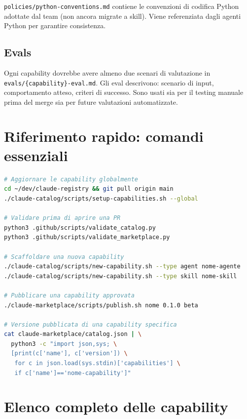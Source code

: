\documentclass[12pt,a4paper,twoside]{book}
\begin{document}
\texttt{policies/python-conventions.md} contiene le convenzioni di codifica Python adottate dal team (non ancora migrate a skill). Viene referenziata dagli agenti Python per garantire consistenza.

\section{Evals}

Ogni capability dovrebbe avere almeno due scenari di valutazione in \texttt{evals/\{capability\}-eval.md}. Gli eval descrivono: scenario di input, comportamento atteso, criteri di successo. Sono usati sia per il testing manuale prima del merge sia per future valutazioni automatizzate.

\appendix

\chapter{Riferimento rapido: comandi essenziali}

\begin{lstlisting}[language=bash]
# Aggiornare le capability globalmente
cd ~/dev/claude-registry && git pull origin main
./claude-catalog/scripts/setup-capabilities.sh --global

# Validare prima di aprire una PR
python3 .github/scripts/validate_catalog.py
python3 .github/scripts/validate_marketplace.py

# Scaffoldare una nuova capability
./claude-catalog/scripts/new-capability.sh --type agent nome-agente
./claude-catalog/scripts/new-capability.sh --type skill nome-skill

# Pubblicare una capability approvata
./claude-marketplace/scripts/publish.sh nome 0.1.0 beta

# Versione pubblicata di una capability specifica
cat claude-marketplace/catalog.json | \
  python3 -c "import json,sys; \
  [print(c['name'], c['version']) \
   for c in json.load(sys.stdin)['capabilities'] \
   if c['name']=='nome-capability']"
\end{lstlisting}

\chapter{Elenco completo delle capability}
\end{document}
